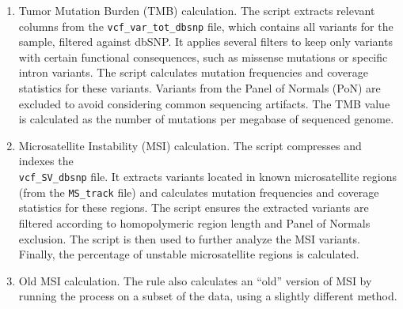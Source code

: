 \begin{enumerate}
    \item Tumor Mutation Burden (TMB) calculation. The script extracts relevant columns from the \texttt{vcf\_var\_tot\_dbsnp} file, which contains all variants for the sample, filtered against dbSNP. It applies several filters to keep only variants with certain functional consequences, such as missense mutations or specific intron variants. The script calculates mutation frequencies and coverage statistics for these variants. Variants from the Panel of Normals (PoN) are excluded to avoid considering common sequencing artifacts. The TMB value is calculated as the number of mutations per megabase of sequenced genome.
    \item Microsatellite Instability (MSI) calculation. The script compresses and indexes the\\ \texttt{vcf\_SV\_dbsnp} file. It extracts variants located in known microsatellite regions (from the \texttt{MS\_track} file) and calculates mutation frequencies and coverage statistics for these regions. The script ensures the extracted variants are filtered according to homopolymeric region length and Panel of Normals exclusion. The script  is then used to further analyze the MSI variants. Finally, the percentage of unstable microsatellite regions is calculated.
    \item Old MSI calculation. The rule also calculates an “old” version of MSI by running the process on a subset of the data, using a slightly different method.
\end{enumerate}